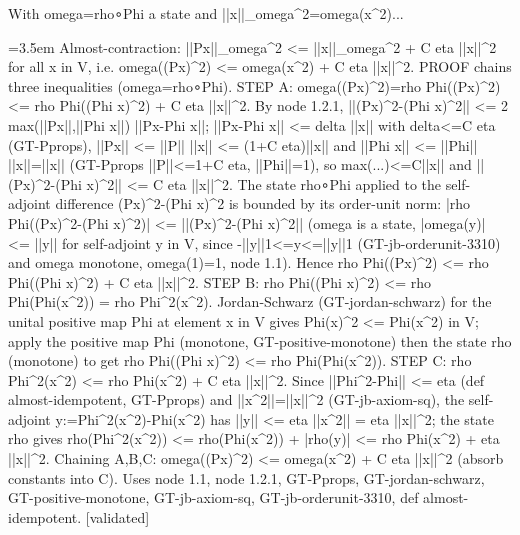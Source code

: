 \documentclass{article}
\newcommand{\step}[1]{\par\noindent\hangindent=3.5em\hangafter=1%
  \makebox[3.5em][l]{\textbf{#1.}}}
\newcommand{\steptag}[1]{\hfill{\small\textsf{[#1]}}}
\begin{document}
\begin{proofbox}{With omega=rho∘Phi a state and ||x||\_omega\textasciicircum{}2=omega(x\textasciicircum{}2)...}
\step{1.2} Almost-contraction: ||Px||\_omega\textasciicircum{}2 <= ||x||\_omega\textasciicircum{}2 + C eta ||x||\textasciicircum{}2 for all x in V, i.e. omega((Px)\textasciicircum{}2) <= omega(x\textasciicircum{}2) + C eta ||x||\textasciicircum{}2. PROOF chains three inequalities (omega=rho∘Phi). STEP A: omega((Px)\textasciicircum{}2)=rho Phi((Px)\textasciicircum{}2) <= rho Phi((Phi x)\textasciicircum{}2) + C eta ||x||\textasciicircum{}2. By node 1.2.1, ||(Px)\textasciicircum{}2-(Phi x)\textasciicircum{}2|| <= 2 max(||Px||,||Phi x||) ||Px-Phi x||; ||Px-Phi x|| <= delta ||x|| with delta<=C eta (GT-Pprops), ||Px|| <= ||P|| ||x|| <= (1+C eta)||x|| and ||Phi x|| <= ||Phi|| ||x||=||x|| (GT-Pprops ||P||<=1+C eta, ||Phi||=1), so max(...)<=C||x|| and ||(Px)\textasciicircum{}2-(Phi x)\textasciicircum{}2|| <= C eta ||x||\textasciicircum{}2. The state rho∘Phi applied to the self-adjoint difference (Px)\textasciicircum{}2-(Phi x)\textasciicircum{}2 is bounded by its order-unit norm: |rho Phi((Px)\textasciicircum{}2-(Phi x)\textasciicircum{}2)| <= ||(Px)\textasciicircum{}2-(Phi x)\textasciicircum{}2|| (omega is a state, |omega(y)| <= ||y|| for self-adjoint y in V, since -||y||1<=y<=||y||1 (GT-jb-orderunit-3310) and omega monotone, omega(1)=1, node 1.1). Hence rho Phi((Px)\textasciicircum{}2) <= rho Phi((Phi x)\textasciicircum{}2) + C eta ||x||\textasciicircum{}2. STEP B: rho Phi((Phi x)\textasciicircum{}2) <= rho Phi(Phi(x\textasciicircum{}2)) = rho Phi\textasciicircum{}2(x\textasciicircum{}2). Jordan-Schwarz (GT-jordan-schwarz) for the unital positive map Phi at element x in V gives Phi(x)\textasciicircum{}2 <= Phi(x\textasciicircum{}2) in V; apply the positive map Phi (monotone, GT-positive-monotone) then the state rho (monotone) to get rho Phi((Phi x)\textasciicircum{}2) <= rho Phi(Phi(x\textasciicircum{}2)). STEP C: rho Phi\textasciicircum{}2(x\textasciicircum{}2) <= rho Phi(x\textasciicircum{}2) + C eta ||x||\textasciicircum{}2. Since ||Phi\textasciicircum{}2-Phi|| <= eta (def almost-idempotent, GT-Pprops) and ||x\textasciicircum{}2||=||x||\textasciicircum{}2 (GT-jb-axiom-sq), the self-adjoint y:=Phi\textasciicircum{}2(x\textasciicircum{}2)-Phi(x\textasciicircum{}2) has ||y|| <= eta ||x\textasciicircum{}2|| = eta ||x||\textasciicircum{}2; the state rho gives rho(Phi\textasciicircum{}2(x\textasciicircum{}2)) <= rho(Phi(x\textasciicircum{}2)) + |rho(y)| <= rho Phi(x\textasciicircum{}2) + eta ||x||\textasciicircum{}2. Chaining A,B,C: omega((Px)\textasciicircum{}2) <= omega(x\textasciicircum{}2) + C eta ||x||\textasciicircum{}2 (absorb constants into C). Uses node 1.1, node 1.2.1, GT-Pprops, GT-jordan-schwarz, GT-positive-monotone, GT-jb-axiom-sq, GT-jb-orderunit-3310, def almost-idempotent. \steptag{validated} \\[6pt]

\end{proofbox}
\end{document}
